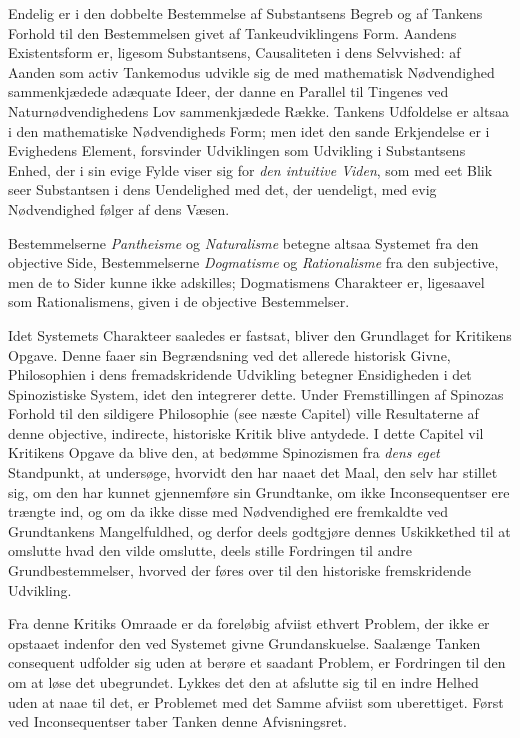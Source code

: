 \documentclass[12pt,a4paper]{book}
\newcommand{\opage}[1]{\marginnote{\footnotesize\textit{[#1]}}}
\begin{document}
Endelig er i den dobbelte Bestemmelse af Substantsens
Begreb og af Tankens Forhold til den Bestemmelsen givet
af Tankeudviklingens Form. Aandens Existentsform er, ligesom
Substantsens, Causaliteten i dens Selvvished: af Aanden
som activ Tankemodus udvikle sig de med mathematisk
Nødvendighed sammenkjædede adæquate Ideer, der danne
en Parallel til Tingenes ved Naturnødvendighedens Lov
sammenkjædede Række. Tankens Udfoldelse er altsaa i den
mathematiske Nødvendigheds Form; men idet den sande
Erkjendelse er i Evighedens Element, forsvinder Udviklingen
som Udvikling i Substantsens Enhed, der i sin evige Fylde
viser sig for \emph{den intuitive Viden}, som med eet Blik
seer Substantsen i dens Uendelighed med det, der uendeligt,
med evig Nødvendighed følger af dens Væsen.

\opage{174} Bestemmelserne \emph{Pantheisme} og \emph{Naturalisme} betegne
altsaa Systemet fra den objective Side, Bestemmelserne
\emph{Dogmatisme} og \emph{Rationalisme} fra den subjective, men
de to Sider kunne ikke adskilles; Dogmatismens Charakteer
er, ligesaavel som Rationalismens, given i de objective Bestemmelser.

Idet Systemets Charakteer saaledes er fastsat, bliver
den Grundlaget for Kritikens Opgave. Denne faaer sin Begrændsning
ved det allerede historisk Givne, Philosophien
i dens fremadskridende Udvikling betegner Ensidigheden i
det Spinozistiske System, idet den integrerer dette. Under
Fremstillingen af Spinozas Forhold til den sildigere Philosophie
(see næste Capitel) ville Resultaterne af denne objective,
indirecte, historiske Kritik blive antydede. I dette
Capitel vil Kritikens Opgave da blive den, at bedømme Spinozismen
fra \emph{dens eget} Standpunkt, at undersøge, hvorvidt
den har naaet det Maal, den selv har stillet sig, om
den har kunnet gjennemføre sin Grundtanke, om ikke Inconsequentser
ere trængte ind, og om da ikke disse med
Nødvendighed ere fremkaldte ved Grundtankens Mangelfuldhed,
og derfor deels godtgjøre dennes Uskikkethed til
at omslutte hvad den vilde omslutte, deels stille Fordringen
til andre Grundbestemmelser, hvorved der føres over til
den historiske fremskridende Udvikling.

Fra denne Kritiks Omraade er da foreløbig afviist ethvert
Problem, der ikke er opstaaet indenfor den ved Systemet
givne Grundanskuelse. Saalænge Tanken consequent
udfolder sig uden at berøre et saadant Problem, er Fordringen
til den om at løse det ubegrundet. Lykkes det
den at afslutte sig til en indre Helhed uden at naae til
det, er Problemet med det Samme afviist som uberettiget.
Først ved Inconsequentser taber Tanken denne Afvisningsret.
\end{document}
